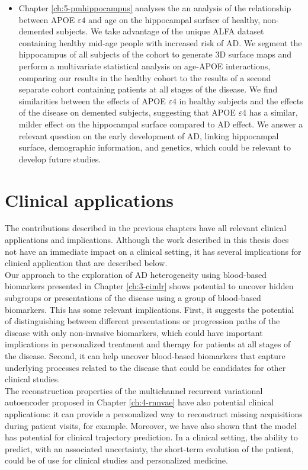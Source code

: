 \begin{itemize}
\item Chapter \ref{ch:5-pmhippocampus} analyses the an analysis of the relationship between APOE $\varepsilon4$ and age on the hippocampal surface of healthy, non-demented subjects. We take advantage of the unique ALFA dataset containing healthy mid-age people with increased risk of AD. We segment the hippocampus of all subjects of the cohort to generate 3D surface maps and perform a multivariate statistical analysis on age-APOE interactions, comparing our results in the healthy cohort to the results of a second separate cohort containing patients at all stages of the disease. We find similarities between the effects of APOE $\varepsilon4$ in healthy subjects and the effects of the disease on demented subjects, suggesting that APOE $\varepsilon4$ has a similar, milder effect on the hippocampal surface compared to AD effect. We answer a relevant question on the early development of AD, linking hippocampal surface, demographic information, and genetics, which could be relevant to develop future studies.
\end{itemize}

\section{Clinical applications}
The contributions described in the previous chapters have all relevant clinical applications and implications. Although the work described in this thesis does not have an immediate impact on a clinical setting, it has several implications for clinical application that are described below. \\

Our approach to the exploration of AD heterogeneity using blood-based biomarkers presented in Chapter \ref{ch:3-cimlr} shows potential to uncover hidden subgroups or presentations of the disease using a group of blood-based biomarkers. This has some relevant implications. First, it suggests the potential of distinguishing between different presentations or progression paths of the disease with only non-invasive biomarkers, which could have important implications in personalized treatment and therapy for patients at all stages of the disease. Second, it can help uncover blood-based biomarkers that capture underlying processes related to the disease that could be candidates for other clinical studies. \\

The reconstruction properties of the multichannel recurrent variational autoencoder proposed in Chapter \ref{ch:4-rnnvae} have also potential clinical applications: it can provide a personalized way to reconstruct missing acquisitions during patient visits, for example. Moreover, we have also shown that the model has potential for clinical trajectory prediction. In a clinical setting, the ability to predict, with an associated uncertainty, the short-term evolution of the patient, could be of use for clinical studies and personalized medicine. \\

